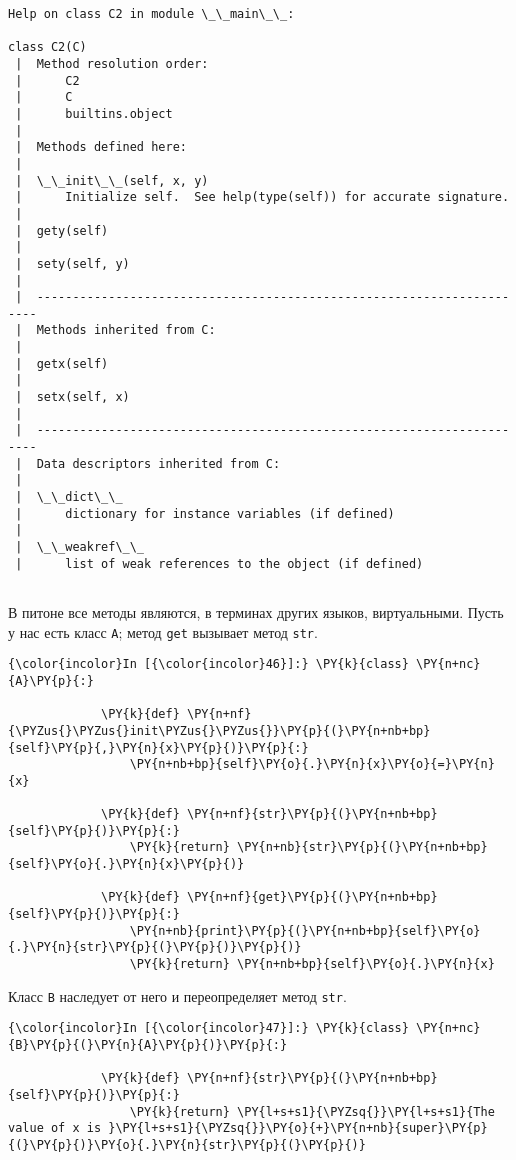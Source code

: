     \begin{Verbatim}[commandchars=\\\{\}]
Help on class C2 in module \_\_main\_\_:

class C2(C)
 |  Method resolution order:
 |      C2
 |      C
 |      builtins.object
 |  
 |  Methods defined here:
 |  
 |  \_\_init\_\_(self, x, y)
 |      Initialize self.  See help(type(self)) for accurate signature.
 |  
 |  gety(self)
 |  
 |  sety(self, y)
 |  
 |  ----------------------------------------------------------------------
 |  Methods inherited from C:
 |  
 |  getx(self)
 |  
 |  setx(self, x)
 |  
 |  ----------------------------------------------------------------------
 |  Data descriptors inherited from C:
 |  
 |  \_\_dict\_\_
 |      dictionary for instance variables (if defined)
 |  
 |  \_\_weakref\_\_
 |      list of weak references to the object (if defined)


    \end{Verbatim}

    В питоне все методы являются, в терминах других языков, виртуальными.
Пусть у нас есть класс \texttt{A}; метод \texttt{get} вызывает метод
\texttt{str}.

    \begin{Verbatim}[commandchars=\\\{\}]
{\color{incolor}In [{\color{incolor}46}]:} \PY{k}{class} \PY{n+nc}{A}\PY{p}{:}
             
             \PY{k}{def} \PY{n+nf}{\PYZus{}\PYZus{}init\PYZus{}\PYZus{}}\PY{p}{(}\PY{n+nb+bp}{self}\PY{p}{,}\PY{n}{x}\PY{p}{)}\PY{p}{:}
                 \PY{n+nb+bp}{self}\PY{o}{.}\PY{n}{x}\PY{o}{=}\PY{n}{x}
                 
             \PY{k}{def} \PY{n+nf}{str}\PY{p}{(}\PY{n+nb+bp}{self}\PY{p}{)}\PY{p}{:}
                 \PY{k}{return} \PY{n+nb}{str}\PY{p}{(}\PY{n+nb+bp}{self}\PY{o}{.}\PY{n}{x}\PY{p}{)}
                 
             \PY{k}{def} \PY{n+nf}{get}\PY{p}{(}\PY{n+nb+bp}{self}\PY{p}{)}\PY{p}{:}
                 \PY{n+nb}{print}\PY{p}{(}\PY{n+nb+bp}{self}\PY{o}{.}\PY{n}{str}\PY{p}{(}\PY{p}{)}\PY{p}{)}
                 \PY{k}{return} \PY{n+nb+bp}{self}\PY{o}{.}\PY{n}{x}
\end{Verbatim}

    Класс \texttt{B} наследует от него и переопределяет метод \texttt{str}.

    \begin{Verbatim}[commandchars=\\\{\}]
{\color{incolor}In [{\color{incolor}47}]:} \PY{k}{class} \PY{n+nc}{B}\PY{p}{(}\PY{n}{A}\PY{p}{)}\PY{p}{:}
             
             \PY{k}{def} \PY{n+nf}{str}\PY{p}{(}\PY{n+nb+bp}{self}\PY{p}{)}\PY{p}{:}
                 \PY{k}{return} \PY{l+s+s1}{\PYZsq{}}\PY{l+s+s1}{The value of x is }\PY{l+s+s1}{\PYZsq{}}\PY{o}{+}\PY{n+nb}{super}\PY{p}{(}\PY{p}{)}\PY{o}{.}\PY{n}{str}\PY{p}{(}\PY{p}{)}
\end{Verbatim}

